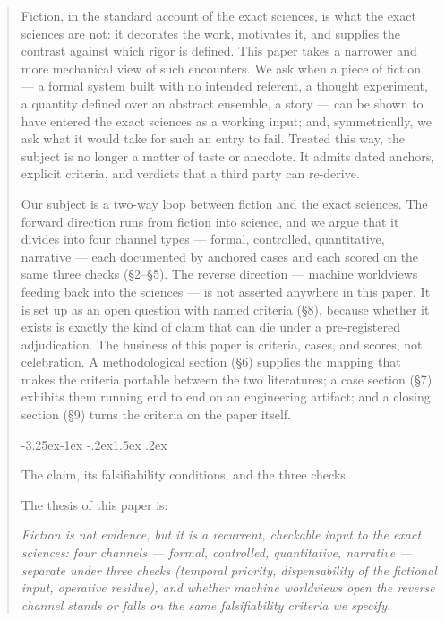 \documentclass[11pt,a4paper]{article}
\makeatletter
\renewcommand\subsection{\@startsection{subsection}{2}{\z@}%
  {-3.25ex\@plus -1ex \@minus -.2ex}{1.5ex \@plus .2ex}%
  {\normalfont\large\bfseries\raggedright}}
\makeatother
\begin{document}
\begin{abstract}
Fiction, in the standard account of the exact sciences, is what the exact sciences are not: it decorates the work, motivates it, and supplies the contrast against which rigor is defined. This paper takes a narrower and more mechanical view of such encounters. We ask when a piece of fiction — a formal system built with no intended referent, a thought experiment, a quantity defined over an abstract ensemble, a story — can be shown to have entered the exact sciences as a working input; and, symmetrically, we ask what it would take for such an entry to fail. Treated this way, the subject is no longer a matter of taste or anecdote. It admits dated anchors, explicit criteria, and verdicts that a third party can re-derive.

Our subject is a two-way loop between fiction and the exact sciences. The forward direction runs from fiction into science, and we argue that it divides into four channel types — formal, controlled, quantitative, narrative — each documented by anchored cases and each scored on the same three checks (§2–§5). The reverse direction — machine worldviews feeding back into the sciences — is not asserted anywhere in this paper. It is set up as an open question with named criteria (§8), because whether it exists is exactly the kind of claim that can die under a pre-registered adjudication. The business of this paper is criteria, cases, and scores, not celebration. A methodological section (§6) supplies the mapping that makes the criteria portable between the two literatures; a case section (§7) exhibits them running end to end on an engineering artifact; and a closing section (§9) turns the criteria on the paper itself.

\subsection{The claim, its falsifiability conditions, and the three checks}

The thesis of this paper is:

\textit{Fiction is not evidence, but it is a recurrent, checkable input to the exact sciences: four channels — formal, controlled, quantitative, narrative — separate under three checks (temporal priority, dispensability of the fictional input, operative residue), and whether machine worldviews open the reverse channel stands or falls on the same falsifiability criteria we specify.}


\end{abstract}
\end{document}
